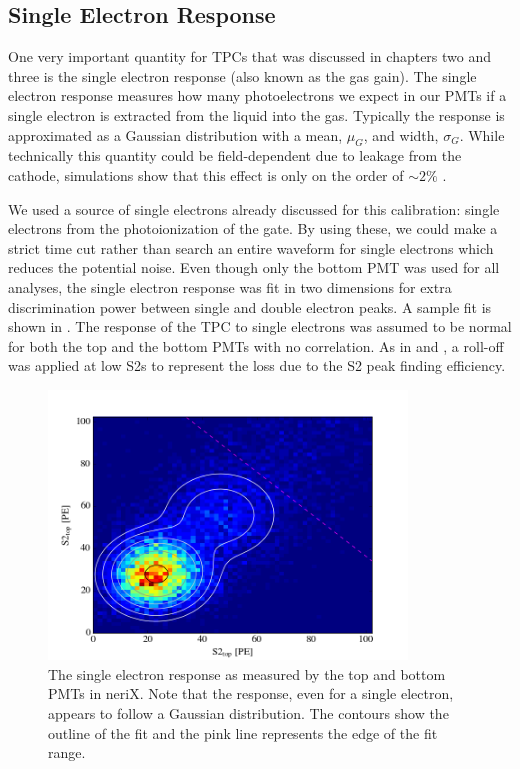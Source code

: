 \subsection{Single Electron Response}
\label{sec:nerix_gas_gain}

One very important quantity for TPCs that was discussed in chapters two and three is the single electron response (also known as the gas gain).  The single electron response measures how many photoelectrons we expect in our PMTs if a single electron is extracted from the liquid into the gas.  Typically the response is approximated as a Gaussian distribution with a mean, $\mu_G$, and width, $\sigma_G$.  While technically this quantity could be field-dependent due to leakage from the cathode, simulations show that this effect is only on the order of $\sim2\%$ \cite{goetzke2015low}.

We used a source of single electrons already discussed for this calibration: single electrons from the photoionization of the gate.  By using these, we could make a strict time cut rather than search an entire waveform for single electrons which reduces the potential noise.  Even though only the bottom PMT was used for all analyses, the single electron response was fit in two dimensions for extra discrimination power between single and double electron peaks.  A sample fit is shown in .  The response of the TPC to single electrons was assumed to be normal for both the top and the bottom PMTs with no correlation.  As in  and , a roll-off was applied at low S2s to represent the loss due to the S2 peak finding efficiency.

\begin{figure}[t]
        \centering
	\includegraphics[width=0.85\textwidth]{nerix_gas_gain}
	\caption{The single electron response as measured by the top and bottom PMTs in neriX.  Note that the response, even for a single electron, appears to follow a Gaussian distribution.  The contours show the outline of the fit and the pink line represents the edge of the fit range.}
	\label{fig:nerix_gas_gain}
\end{figure}

